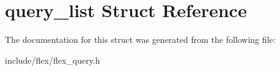 \hypertarget{structquery__list}{}\section{query\+\_\+list Struct Reference}
\label{structquery__list}


The documentation for this struct was generated from the following file\+:\begin{DoxyCompactItemize}
\item 
include/flex/flex\+\_\+query.\+h\end{DoxyCompactItemize}
